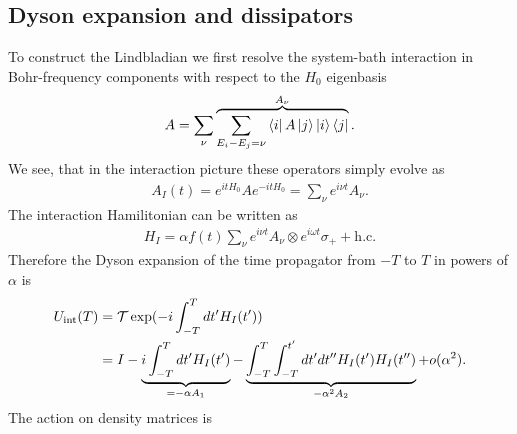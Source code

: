 \documentclass[12pt,a4paper]{article}
\begin{document}
\subsection{Dyson expansion and dissipators}
To construct the Lindbladian we first resolve the system-bath interaction in Bohr-frequency components with respect to the $H_0$ eigenbasis
\begin{align}
A = \sum_{\nu} \overbrace{\sum_{E_i-E_j = \nu} \bra{i}A\ket{j}\ket{i}\bra{j}}^{A_{\nu}}.
\end{align}
We see, that in the interaction picture these operators simply evolve as
\begin{align}\label{eq:interaction_hamiltonian}
A_I(t) = e^{itH_0}Ae^{-itH_0}=\sum_{\nu} e^{i\nu t}{A_{\nu}}.
\end{align} The interaction Hamilitonian can be written as
\begin{align}
    H_I =  \alpha f(t) \sum_{\nu} e^{i\nu t}{A_{\nu}}\otimes e^{i\omega t} \sigma_+ + \textrm{h.c.} 
\end{align}
Therefore the Dyson expansion of the time propagator from $-T$ to $T$ in powers of $\alpha$ is
\begin{align}
    U_{\rm int}(T) &= \mathcal{T} \exp(-i \int_{-T}^T dt' H_I(t'))
                    \nonumber\\ &= I - \underbrace{i \int_{-T}^T dt' H_I(t')}_{=-\alpha A_1}-
                    \underbrace{\int_{-T}^T \int_{-T}^{t'} dt'dt'' H_I(t') H_I(t'')}_{-\alpha^2 A_2} + o(\alpha^2).
\end{align}
The action on density matrices is
\end{document}
